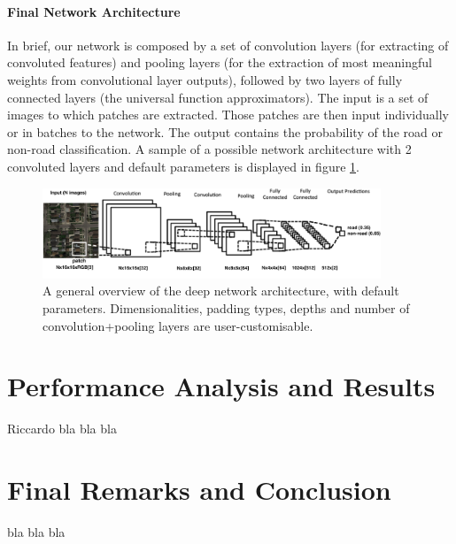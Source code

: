 \documentclass[fleqn,9 pt]{SelfArx} %
\begin{document}
\begin{sloppypar}
\paragraph{Final Network Architecture}

In brief, our network is composed by a set of convolution layers (for extracting of convoluted features) and pooling layers (for the extraction of most meaningful weights from convolutional layer outputs), followed by two layers of fully connected layers (the universal function approximators). The input is a set of images to which patches are extracted. Those patches are then input individually or in batches to the network. The output contains the probability of the road or non-road classification. A sample of a possible network architecture with 2 convoluted layers and default parameters is displayed in figure \ref{fig-conv-2d-architecture}.

\begin{figure}
\centering
\includegraphics[width=0.9\textwidth]{figures/conv_2d_network.png}
\caption{\small A general overview of the deep network architecture, with default parameters. Dimensionalities, padding types, depths and number of convolution+pooling layers are user-customisable.}
\label{fig-conv-2d-architecture}
\end{figure}

\section{Performance Analysis and Results}

Riccardo bla bla bla

\section{Final Remarks and Conclusion}
\label{sec-Conclusion}

bla bla bla 





\end{sloppypar}
\end{document}
